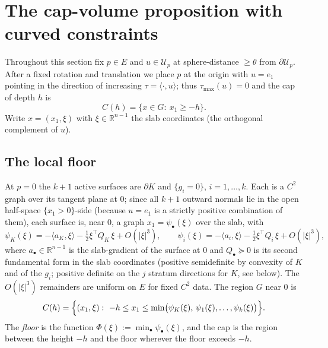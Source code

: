 \documentclass[11pt]{article}
\newcommand{\R}{\mathbb{R}}
\begin{document}
\section{The cap-volume proposition with curved constraints}\label{sec:cap}

Throughout this section fix $p\in E$ and $u\in\mathcal U_p$ at sphere-distance
$\ge\theta$ from $\partial\mathcal U_p$.  After a fixed rotation and translation
we place $p$ at the origin with $u=e_1$ pointing in the direction of increasing
$\tau=\langle\cdot,u\rangle$; thus $\tau_{\max}(u)=0$ and the cap of depth $h$ is
\[
C(h)=\{x\in G:\ x_1\ge-h\}.
\]
Write $x=(x_1,\xi)$ with $\xi\in\R^{n-1}$ the slab coordinates (the orthogonal
complement of $u$).

\subsection{The local floor}\label{ss:floor}

At $p=0$ the $k+1$ active surfaces are $\partial K$ and $\{g_i=0\}$,
$i=1,\dots,k$.  Each is a $C^2$ graph over its tangent plane at $0$; since all
$k+1$ outward normals lie in the open half-space $\{x_1>0\}$-side (because
$u=e_1$ is a strictly positive combination of them), each surface is, near $0$,
a graph $x_1=\psi_\bullet(\xi)$ over the slab, with
\begin{equation}\label{eq:graphs}
\psi_K(\xi)=-\langle a_K,\xi\rangle-\tfrac12\xi^\top Q_K\,\xi+O(|\xi|^3),
\qquad
\psi_i(\xi)=-\langle a_i,\xi\rangle-\tfrac12\xi^\top Q_i\,\xi+O(|\xi|^3),
\end{equation}
where $a_\bullet\in\R^{n-1}$ is the slab-gradient of the surface at $0$ and
$Q_\bullet\succeq0$ is its second fundamental form in the slab coordinates
(positive semidefinite by convexity of $K$ and of the $g_i$; positive definite
on the $j$ stratum directions for $K$, see below).  The $O(|\xi|^3)$ remainders
are uniform on $E$ for fixed $C^2$ data.  The region $G$ near $0$ is
\begin{equation}\label{eq:feasible}
C(h)=\Bigl\{(x_1,\xi):\ -h\le x_1\le\min\bigl(\psi_K(\xi),\,\psi_1(\xi),\dots,\psi_k(\xi)\bigr)\Bigr\}.
\end{equation}
The \emph{floor} is the function $\Phi(\xi):=\min_\bullet\psi_\bullet(\xi)$, and
the cap is the region between the height $-h$ and the floor wherever the floor
exceeds $-h$.
\end{document}
